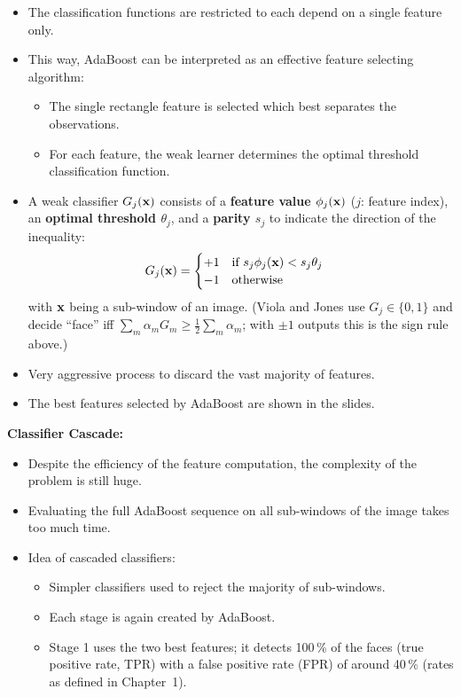   \begin{itemize}
    \item The classification functions are restricted to each depend on a single feature only. %
    \item This way, AdaBoost can be interpreted as an effective feature selecting algorithm:
      \begin{itemize}
        \item The single rectangle feature is selected which best separates the observations. %
        \item For each feature, the weak learner determines the optimal threshold classification function.
      \end{itemize}
     \item A weak classifier $G_j(\bm{\mathrm{x}})$ consists of a \textbf{feature value $\phi_j(\bm{\mathrm{x}})$} ($j$: feature index), an \textbf {optimal threshold $\theta_j$}, and a \textbf{parity $s_j$} to indicate the direction of the inequality:
      \begin{displaymath}
        G_j(\bm{\mathrm{x}}) = \begin{cases}
                        +1 \quad \mbox{if} ~s_j \phi_j(\bm{\mathrm{x}}) < s_j \theta_j \\
                        -1 \quad \mbox{otherwise}
                      \end{cases}
      \end{displaymath}
      with $\bm{\mathrm{x}}$ being a sub-window of an image. (Viola and Jones use $G_j\in\{0,1\}$ and decide ``face'' iff $\sum_m\alpha_m G_m\ge\frac12\sum_m\alpha_m$; with $\pm1$ outputs this is the sign rule above.)
    \item Very aggressive process to discard the vast majority of features.
 \item The best features selected by AdaBoost are shown in the slides.
  \end{itemize}
 \textbf {Classifier Cascade:}

  \begin{itemize}
    \item Despite the efficiency of the feature computation, the complexity of the problem is still huge. %
    \item Evaluating the full AdaBoost sequence on all sub-windows of the image takes too much time.
    \item Idea of cascaded classifiers:
    \begin{itemize}
      \item Simpler classifiers used to reject the majority of sub-windows. %
      \item Each stage is again created by AdaBoost. %
      \item Stage 1 uses the two best features; it detects 100\,\% of the faces (true positive rate, TPR) with a false positive rate (FPR) of around 40\,\% (rates as defined in Chapter~1).
    \end{itemize}
  \end{itemize}


